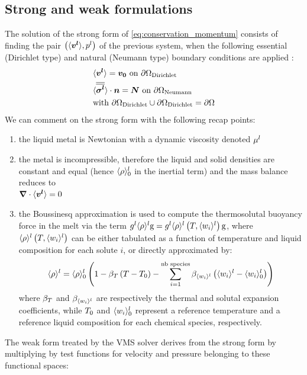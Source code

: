 \subsection{Strong and weak formulations}
The solution of the strong form of \cref{eq:conservation_momentum} consists of finding the pair 
$\left( \langle \boldsymbol{v^l} \rangle, {p^l} \right)$ of the previous system, when the following essential (Dirichlet type) and natural (Neumann type) boundary 
conditions are applied :
\begin{align}
& \langle \boldsymbol{v^l} \rangle = \boldsymbol{v_0} \text{ on } \partial \Omega_\text{Dirichlet}  \\
&  \langle {\overline{\overline{\ensuremath{\boldsymbol{\sigma^l}}}}} \rangle \cdot \boldsymbol{n} = \boldsymbol{N}  \text{ on } \partial \Omega_\text{Neumann} \\
&\text{with } \partial\Omega_\text{Dirichlet} \cup  \partial\Omega_\text{Dirichlet} = \partial\Omega
\end{align}
We can comment on the strong form with the following recap points:
\begin{enumerate}
\itemsep0em
\item	the liquid metal is Newtonian with a dynamic viscosity denoted $\mu^l$
\item	the metal is incompressible, therefore the liquid and solid densities are constant and equal (hence
		$\langle \rho \rangle^l_0$ in the inertial term) and the mass balance reduces to \\ $\boldsymbol{\nabla} \cdot \langle \boldsymbol{v^l} \rangle =0$
\item	the Boussinesq approximation is used to compute the thermosolutal buoyancy force in the melt
		via the term ${g^l} \langle \rho \rangle^l \boldsymbol{\text{g}} = {g^l} \langle \rho \rangle^l \left( T,\langle w_i \rangle^l \right) \boldsymbol{\text{g}}$, where $\langle \rho \rangle^l \left( T,\langle w_i \rangle^l \right)$
		can be either tabulated as a function of temperature and liquid composition for each solute $i$, or directly 
		approximated by:
		\begin{align}
		\label{eq:boussinesq}
 		\langle \rho \rangle^l = \langle \rho \rangle^l_0 \left( 1-\beta_T \left( T-T_{0} \right)- \sum_{i=1}^{\text{nb species}} \beta_{\langle w_i \rangle^l} \left( \langle w_i \rangle^l-\langle w_i \rangle_{0}^l \right) \right)
		\end{align}
		where $\beta_T$ and $\beta_{\langle w_i \rangle^l}$ are respectively the thermal and solutal expansion coefficients, while
		$T_{0}$ and $\langle w_i \rangle_{0}^l$ represent a reference temperature and a reference liquid composition for each chemical species, respectively.\end{enumerate}
The weak form treated by the VMS solver derives from the strong form by multiplying
by test functions for velocity and pressure belonging to these functional spaces:
